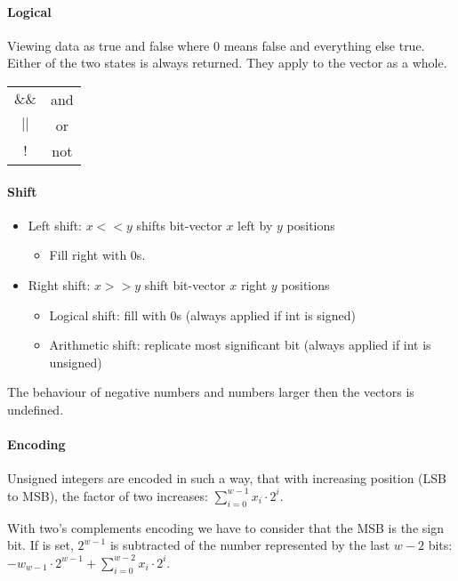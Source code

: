 \paragraph{Logical}
Viewing data as true and false where $0$ means false and everything else true. Either of the two states is always returned. They apply to the vector as a whole.

\begin{tabular}{c | c}
    $\&\&$ & and\\
    $||$ & or\\
    $!$ & not
\end{tabular}

\paragraph{Shift}
\begin{itemize}
    \item Left shift: $x << y$ shifts bit-vector $x$ left by $y$ positions
        \begin{itemize}
            \item Fill right with $0$s.
        \end{itemize}
    \item Right shift: $x >> y$ shift bit-vector $x$ right $y$ positions
        \begin{itemize}
            \item Logical shift: fill with $0$s (always applied if int is signed)
            \item Arithmetic shift: replicate most significant bit (always applied if int is unsigned)
        \end{itemize}
\end{itemize}

The behaviour of negative numbers and numbers larger then the vectors is undefined.

\paragraph{Encoding}

Unsigned integers are encoded in such a way, that with increasing position (LSB to MSB), the factor of two increases: $\sum_{i=0}^{w-1} x_i \cdot 2^i$.

With two's complements encoding we have to consider that the MSB is the sign bit. If is set, $2^{w-1}$ is subtracted of the number represented by the last $w-2$ bits: $-w_{w - 1} \cdot 2^{w - 1} + \sum_{i=0}^{w - 2} x_i \cdot 2^i$.

